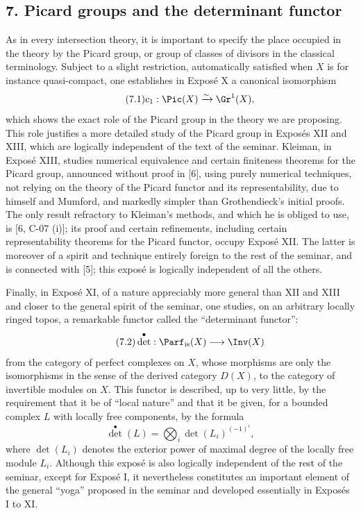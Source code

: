 \subsection*{7. Picard groups and the determinant functor}
As in every intersection theory, it is important to specify the place occupied in the theory by the Picard group, or group of classes of divisors in the classical terminology. Subject to a slight restriction, automatically satisfied when $X$ is for instance quasi-compact, one establishes in Expos\'e X a canonical isomorphism
\begin{equation}\tag{7.1}
c_1:\Pic(X)\xrightarrow{\sim}\Gr^1(X),
\end{equation}
which shows the exact role of the Picard group in the theory we are proposing. This role justifies a more detailed study of the Picard group in Expos\'es XII and XIII, which are logically independent of the text of the seminar. Kleiman, in Expos\'e XIII, studies numerical equivalence and certain finiteness theorems for the Picard group, announced without proof in [6], using purely numerical techniques, not relying on the theory of the Picard functor and its representability, due to himself and Mumford, and markedly simpler than Grothendieck's initial proofs. The only result refractory to Kleiman's methods, and which he is obliged to use, is [6, C-07 (i)]; its proof and certain refinements, including certain representability theorems for the Picard functor, occupy Expos\'e XII. The latter is moreover of a spirit and technique entirely foreign to the rest of the seminar, and is connected with [5]; this expos\'e is logically independent of all the others.

Finally, in Expos\'e XI, of a nature appreciably more general than XII and XIII and closer to the general spirit of the seminar, one studies, on an arbitrary locally ringed topos, a remarkable functor called the ``determinant functor'':
\begin{equation}\tag{7.2}
\det^\bullet:\Parf_{\mathrm{is}}(X)\longrightarrow \Inv(X)
\end{equation}
from the category of perfect complexes on $X$, whose morphisms are only the isomorphisms in the sense of the derived category $D(X)$, to the category of invertible modules on $X$. This functor is described, up to very little, by the requirement that it be of ``local nature'' and that it be given, for a bounded complex $L$ with locally free components, by the formula
\begin{equation}\tag{7.3}
\det^\bullet(L)=\bigotimes_i \det(L_i)^{(-1)^i},
\end{equation}
where $\det(L_i)$ denotes the exterior power of maximal degree of the locally free module $L_i$. Although this expos\'e is also logically independent of the rest of the seminar, except for Expos\'e I, it nevertheless constitutes an important element of the general ``yoga'' proposed in the seminar and developed essentially in Expos\'es I to XI.

